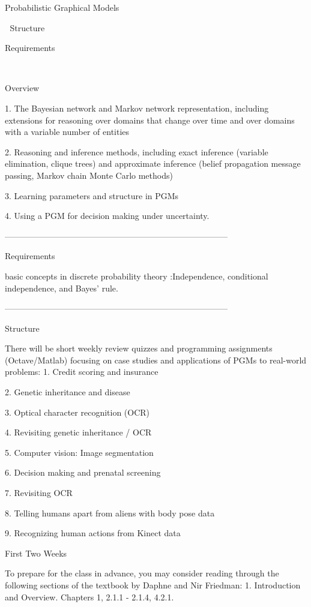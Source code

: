 

Probabilistic Graphical Models



Structure

Requirements



Overview

1.
The Bayesian network and Markov network representation, including extensions for reasoning over domains that change over time and over domains with a variable number of entities

2.
Reasoning and inference methods, including exact inference (variable elimination, clique trees) and approximate inference (belief propagation message passing, Markov chain Monte Carlo methods)

3.
Learning parameters and structure in PGMs

4.
Using a PGM for decision making under uncertainty.





--------------------------------------------------------------------------------


Requirements

basic concepts in discrete probability theory :Independence, conditional independence, and Bayes' rule.





--------------------------------------------------------------------------------



Structure


There will be short weekly review quizzes and programming assignments (Octave/Matlab) focusing on case studies and applications of PGMs to real-world problems:
1.
Credit scoring and insurance

2.
Genetic inheritance and disease

3.
Optical character recognition (OCR)

4.
Revisiting genetic inheritance / OCR

5.
Computer vision: Image segmentation

6.
Decision making and prenatal screening

7.
Revisiting OCR

8.
Telling humans apart from aliens with body pose data

9.
Recognizing human actions from Kinect data


First Two Weeks

To prepare for the class in advance, you may consider reading through the following sections of the textbook by Daphne and Nir Friedman:
1.
Introduction and Overview. Chapters 1, 2.1.1 - 2.1.4, 4.2.1.

